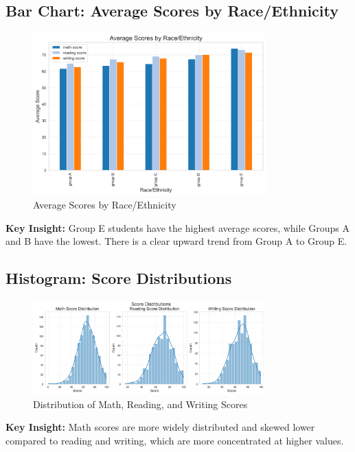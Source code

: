 \documentclass[12pt]{article}
\begin{document}
\subsection{Bar Chart: Average Scores by Race/Ethnicity}
\begin{figure}[H]
    \centering
    \includegraphics[width=0.8\textwidth]{figures/barchart_avg_scores_by_race.png}
    \caption{Average Scores by Race/Ethnicity}
\end{figure}
\textbf{Key Insight:} Group E students have the highest average scores, while Groups A and B have the lowest. There is a clear upward trend from Group A to Group E.

\subsection{Histogram: Score Distributions}
\begin{figure}[H]
    \centering
    \includegraphics[width=0.8\textwidth]{figures/histograms_scores.png}
    \caption{Distribution of Math, Reading, and Writing Scores}
\end{figure}
\textbf{Key Insight:} Math scores are more widely distributed and skewed lower compared to reading and writing, which are more concentrated at higher values.
\end{document}
